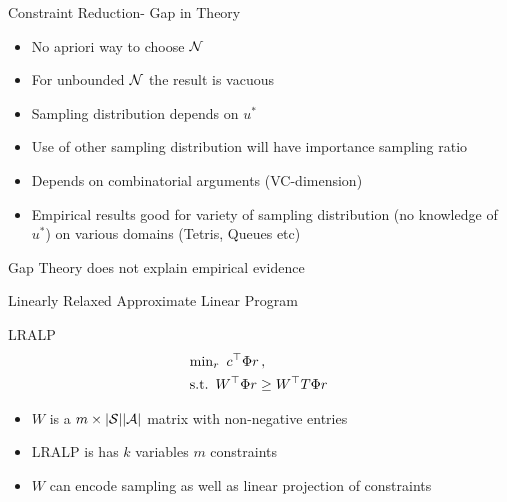 \documentclass[10pt,handout]{beamer}
\begin{document}
\begin{frame}[fragile]{Constraint Reduction- Gap in Theory}
\begin{block}{\cite{de2004constraint}}
\begin{itemize}
\item No apriori way to choose $\mathcal{N}$
\item For unbounded $\mathcal{N}$ the result is vacuous
\item Sampling distribution depends on $u^*$
\item Use of other sampling distribution will have importance sampling ratio
\item Depends on combinatorial arguments (VC-dimension)
\item Empirical results good for variety of sampling distribution (no knowledge of $u^*$) on various domains (Tetris, Queues etc)
\end{itemize}
\end{block}
\begin{block}{Gap}
Theory does not explain empirical evidence
\end{block}
\end{frame}

\begin{frame}[fragile]{Linearly Relaxed Approximate Linear Program}
\begin{block}{LRALP}
\begin{align*}
&{\min}_r \,\mbox{ } c^\top \Phi r\,,\\
&\text{s.t.} \,\,\, W^\top  \Phi r\geq W^\top T \Phi r\,\\
\end{align*}
\end{block}
\begin{itemize}
\item $W$ is a $m\times |\mathcal{S}||\mathcal{A}|$ matrix with non-negative entries
\item LRALP is has $k$ variables $m$ constraints
\item $W$ can encode sampling as well as linear projection of constraints
\end{itemize}
\end{frame}
\end{document}
